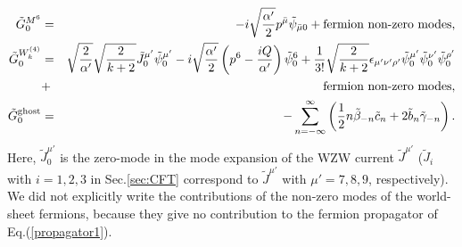 \documentclass[a4paper,prd,preprint]{revtex4}
\begin{document}
\begin{eqnarray}
 {\tilde G}_0^{M^6} &=&
  - i \sqrt{{\alpha'} \over 2} p^{\bar \mu}
      {\tilde \psi}_{{\bar \mu} 0}
  + \mbox{fermion non-zero modes},
\\
 {\tilde G}_0^{W^{(4)}_k} &=&
  \sqrt{{2 \over {\alpha'}}} \sqrt{{2 \over {k+2}}}
   {\tilde J}^{\mu'}_0 {\tilde \psi}^{\mu'}_0
 -i \sqrt{{{\alpha'} \over 2}}
    \left( p^6 -{{iQ} \over {\alpha'}} \right) {\tilde \psi}^6_0
 + {1 \over {3!}} \sqrt{{2 \over {k+2}}}
   \epsilon_{\mu'\nu'\rho'} {\tilde \psi}^{\mu'}_0
                            {\tilde \psi}^{\nu'}_0
                            {\tilde \psi}^{\rho'}_0
\nonumber\\
 &+& \mbox{fermion non-zero modes},
\\
 {\tilde G}_0^{\rm ghost} &=&
 - \sum_{n=-\infty}^\infty
   \left(
    {1 \over 2} n {\tilde \beta}_{-n} {\tilde c}_n
    + 2 {\tilde b}_n {\tilde \gamma}_{-n}
   \right).
\end{eqnarray}
Here, ${\tilde J}^{\mu'}_0$ is the zero-mode
 in the mode expansion of the WZW current ${\tilde J}^{\mu'}$
 (${\tilde J}_i$ with $i=1,2,3$ in Sec.\ref{sec:CFT}
 correspond to ${\tilde J}^{\mu'}$ with $\mu'=7,8,9$, respectively).
We did not explicitly write the contributions
 of the non-zero modes of the world-sheet fermions,
 because they give no contribution to the fermion propagator
 of Eq.(\ref{propagator1}).
\end{document}
